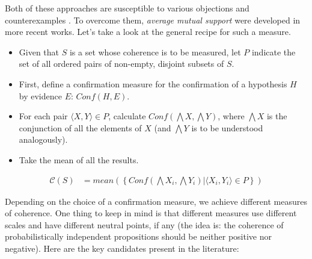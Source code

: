 \documentclass[10pt,]{scrartcl}
\begin{document}
Both of these approaches are susceptible to various objections and counterexamples \citep{Merricks1995,shogenji1999conducive, Akiba2000Shogenjis, Shogenji2001Reply, bovens2004bayesian,Siebel2004On-Fitelsons-me,siebel2006against,Shogenji2006Why,crupi2007BayesianMeasuresEvidential, koscholke2016evaluating, Schippers2019General}. To overcome them, 
\textit{average mutual support} were developed in more recent works. Let’s take a look at  the general recipe for such a measure.


\begin{itemize}
\item
  Given that \(S\) is a set whose coherence is to be measured, let \(P\)
  indicate the set of all ordered pairs of non-empty, disjoint subsets
  of \(S\).
\item
  First, define a confirmation measure for the confirmation of a hypothesis \(H\) by evidence  \(E\): \(Conf(H,E)\).
\item
  For each pair \(\langle X, Y \rangle \in P\), calculate
  \(Conf(\bigwedge X, \bigwedge Y)\), where $\bigwedge X$  is the conjunction of all the elements of $X$ (and $\bigwedge Y$ is to be understood analogously).
\item
  Take the mean of all the results.
\end{itemize}\begin{align*}
    \mathcal{C}(S) & =
mean\left(\left\{Conf(\bigwedge X_i, \bigwedge Y_i) | \langle X_i, Y_i \rangle \in P\right\} \right)
\end{align*}

\noindent Depending on the choice of a confirmation measure, we achieve
different measures of coherence.  One thing to keep in mind is
that different measures use different scales and have different neutral points, if any (the idea is: the coherence of probabilistically independent propositions should be neither positive nor
negative). Here are the key candidates present in the literature:
\end{document}
